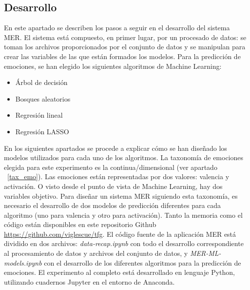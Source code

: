 \documentclass[12pt,a4paper,Spanish]{article}
\begin{document}
\subsection{Desarrollo}
En este apartado se describen los pasos a seguir en el desarrollo del sistema MER. El sistema está compuesto, en primer lugar, por un procesado de datos: se toman los archivos proporcionados por el conjunto de datos y se manipulan para crear las variables de las que están formados los modelos.
\newline
Para la predicción de emociones, se han elegido los siguientes algoritmos de Machine Learning:
\begin{itemize}
	\item Árbol de decisión
	\item Bosques aleatorios
	\item Regresión lineal
	\item Regresión LASSO
\end{itemize}
En los siguientes apartados se procede a explicar cómo se han diseñado los modelos utilizados para cada uno de los algoritmos.
\newline
La taxonomía de emociones elegida para este experimento es la continua/dimensional (ver apartado ~\ref{tax_emo}). Las emociones están representadas por dos valores: valencia y activación. O visto desde el punto de vista de Machine Learning, hay dos variables objetivo. Para diseñar un sistema MER siguiendo esta taxonomía, es necesario el desarrollo de dos modelos de predicción diferentes para cada algoritmo (uno para valencia y otro para activación).
\newline
Tanto la memoria como el código están disponibles en este repositorio Github \url{https://github.com/viglescue/tfg}. El código fuente de la aplicación MER está dividido en dos archivos: \textit{data-recap.ipynb} con todo el desarrollo correspondiente al procesamiento de datos y archivos del conjunto de datos, y \textit{MER-ML-models.ipynb} con el desarrollo de los diferentes algoritmos para la predicción de emociones. El experimento al completo está desarrollado en lenguaje Python, utilizando cuadernos Jupyter en el entorno de Anaconda. 
\end{document}
